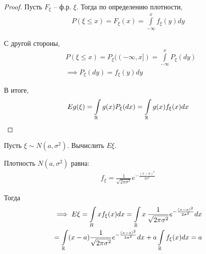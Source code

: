 \begin{corollary}
\begin{enumerate}[label=\protect\circled{\arabic*},series=lebesgue_corollary]
      \begin{proof}
        Пусть $F_{\xi}$ -- ф.р. $\xi$. 
        Тогда по определению плотности,
        \begin{align*}
          P(\xi \leq x) = F_{\xi} (x) = \int\limits_{-\infty}^{x} f_{\xi} (y) dy
        \end{align*}

        С другой стороны,
        \begin{align*}
          &P(\xi \leq x) = P_{\xi} ((-\infty, x]) = \int\limits_{-\infty}^{x} P_{\xi} (dy)\\
          &\implies P_{\xi}(dy) = f_{\xi} (y) dy
        \end{align*}

        В итоге,
        \begin{align*}
          E g(\xi) = \int\limits_{\mathbb{R}} g(x) P_{\xi} (dx) 
          = \int\limits_{\mathbb{R}} g(x) f_{\xi} (x) dx
        \end{align*}

      \end{proof}

      \begin{example}
        Пусть $\xi \sim N(a, \sigma^2)$. Вычислить $E \xi$.

        Плотность $N(a, \sigma^2)$ равна:
        \begin{align*}
          f_\xi = \frac{1}{\sqrt{2 \pi \sigma^2}} e^{- \frac{(x - a)^2}{2\sigma^2}}
        \end{align*}

        Тогда
        \begin{align*}
          \implies E \xi = \int\limits_{R} x f_{\xi} (x) dx 
          = \int\limits_{\mathbb{R}} x\, \frac{1}{\sqrt{2 \pi \sigma^2}}
            e^{- \frac{(x - a)^2}{2\sigma^2}} dx\\
          = \int\limits_{\mathbb{R}} (x - a) \frac{1}{\sqrt{2 \pi \sigma^2}} 
            e^{- \frac{(x - a)^2}{2\sigma^2}} dx + a \int\limits_{\mathbb{R}} f_{\xi} (x) dx = a
        \end{align*}
      \end{example}

  \end{enumerate}
\end{corollary}

